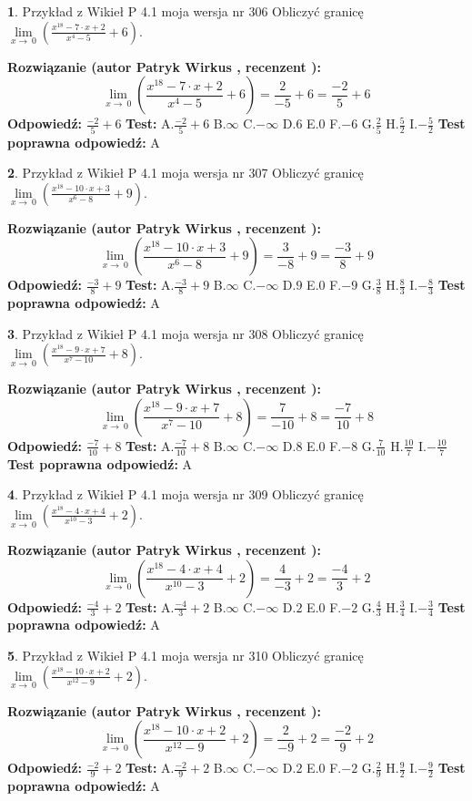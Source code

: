 \documentclass[12pt, a4paper]{article}
\theoremstyle{definition} %
\newtheorem{zad}{}
\newcommand{\zadStart}[1]{\begin{zad}#1\newline}
\newcommand{\zadStop}{\end{zad}}
\newcommand{\rozwStart}[2]{\noindent \textbf{Rozwiązanie (autor #1 , recenzent #2): }\newline}
\newcommand{\rozwStop}{\newline}
\newcommand{\odpStart}{\noindent \textbf{Odpowiedź:}\newline}
\newcommand{\odpStop}{\newline}
\newcommand{\testStart}{\noindent \textbf{Test:}\newline}
\newcommand{\testStop}{\newline}
\newcommand{\kluczStart}{\noindent \textbf{Test poprawna odpowiedź:}\newline}
\newcommand{\kluczStop}{\newline}
\begin{document}
\zadStart{Przykład z Wikieł P 4.1 moja wersja nr 306}
Obliczyć granicę $\lim\limits_{x\to\ 0}(\frac{x^{18}-7 \cdot x +2}{x^{4}-5}+6)$.
\zadStop
\rozwStart{Patryk Wirkus}{}
$$\lim\limits_{x\to\ 0}(\frac{x^{18}-7 \cdot x +2}{x^{4}-5}+6)=\frac{2}{-5}+6=\frac{-2}{5}+6$$
\rozwStop
\odpStart
$\frac{-2}{5}+6$
\odpStop
\testStart
A.$\frac{-2}{5}+6$
B.$\infty$
C.$-\infty$
D.$6$
E.$0$
F.$-6$
G.$\frac{2}{5}$
H.$\frac{5}{2}$
I.$-\frac{5}{2}$
\testStop
\kluczStart
A
\kluczStop



\zadStart{Przykład z Wikieł P 4.1 moja wersja nr 307}
Obliczyć granicę $\lim\limits_{x\to\ 0}(\frac{x^{18}-10 \cdot x +3}{x^{6}-8}+9)$.
\zadStop
\rozwStart{Patryk Wirkus}{}
$$\lim\limits_{x\to\ 0}(\frac{x^{18}-10 \cdot x +3}{x^{6}-8}+9)=\frac{3}{-8}+9=\frac{-3}{8}+9$$
\rozwStop
\odpStart
$\frac{-3}{8}+9$
\odpStop
\testStart
A.$\frac{-3}{8}+9$
B.$\infty$
C.$-\infty$
D.$9$
E.$0$
F.$-9$
G.$\frac{3}{8}$
H.$\frac{8}{3}$
I.$-\frac{8}{3}$
\testStop
\kluczStart
A
\kluczStop



\zadStart{Przykład z Wikieł P 4.1 moja wersja nr 308}
Obliczyć granicę $\lim\limits_{x\to\ 0}(\frac{x^{18}-9 \cdot x +7}{x^{7}-10}+8)$.
\zadStop
\rozwStart{Patryk Wirkus}{}
$$\lim\limits_{x\to\ 0}(\frac{x^{18}-9 \cdot x +7}{x^{7}-10}+8)=\frac{7}{-10}+8=\frac{-7}{10}+8$$
\rozwStop
\odpStart
$\frac{-7}{10}+8$
\odpStop
\testStart
A.$\frac{-7}{10}+8$
B.$\infty$
C.$-\infty$
D.$8$
E.$0$
F.$-8$
G.$\frac{7}{10}$
H.$\frac{10}{7}$
I.$-\frac{10}{7}$
\testStop
\kluczStart
A
\kluczStop



\zadStart{Przykład z Wikieł P 4.1 moja wersja nr 309}
Obliczyć granicę $\lim\limits_{x\to\ 0}(\frac{x^{18}-4 \cdot x +4}{x^{10}-3}+2)$.
\zadStop
\rozwStart{Patryk Wirkus}{}
$$\lim\limits_{x\to\ 0}(\frac{x^{18}-4 \cdot x +4}{x^{10}-3}+2)=\frac{4}{-3}+2=\frac{-4}{3}+2$$
\rozwStop
\odpStart
$\frac{-4}{3}+2$
\odpStop
\testStart
A.$\frac{-4}{3}+2$
B.$\infty$
C.$-\infty$
D.$2$
E.$0$
F.$-2$
G.$\frac{4}{3}$
H.$\frac{3}{4}$
I.$-\frac{3}{4}$
\testStop
\kluczStart
A
\kluczStop



\zadStart{Przykład z Wikieł P 4.1 moja wersja nr 310}
Obliczyć granicę $\lim\limits_{x\to\ 0}(\frac{x^{18}-10 \cdot x +2}{x^{12}-9}+2)$.
\zadStop
\rozwStart{Patryk Wirkus}{}
$$\lim\limits_{x\to\ 0}(\frac{x^{18}-10 \cdot x +2}{x^{12}-9}+2)=\frac{2}{-9}+2=\frac{-2}{9}+2$$
\rozwStop
\odpStart
$\frac{-2}{9}+2$
\odpStop
\testStart
A.$\frac{-2}{9}+2$
B.$\infty$
C.$-\infty$
D.$2$
E.$0$
F.$-2$
G.$\frac{2}{9}$
H.$\frac{9}{2}$
I.$-\frac{9}{2}$
\testStop
\kluczStart
A
\kluczStop
\end{document}
